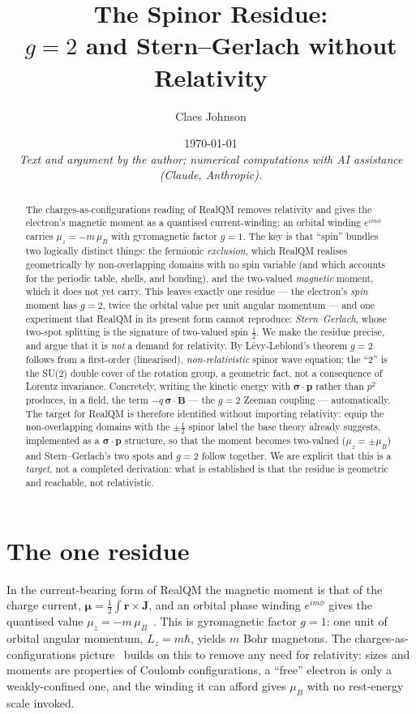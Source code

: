 \documentclass[11pt]{article}
\title{The Spinor Residue:\\
$g=2$ and Stern--Gerlach without Relativity}
\author[1]{Claes Johnson}
\affil[1]{KTH Royal Institute of Technology, SE-100 44 Stockholm, Sweden \\
\texttt{claesjohnson@gmail.com}}
\date{\today \\[0.4em]
\small\textit{Text and argument by the author; numerical computations with AI assistance (Claude, Anthropic).}}
\begin{document}
\maketitle

\begin{abstract}
The charges-as-configurations reading of RealQM removes relativity and gives the electron's magnetic
moment as a quantised current-winding: an orbital winding $e^{im\phi}$ carries $\mu_z = -m\,\mu_B$ with
gyromagnetic factor $g=1$. The key is that ``spin'' bundles two logically distinct things: the fermionic
\emph{exclusion}, which RealQM realises geometrically by non-overlapping domains with no spin variable
(and which accounts for the periodic table, shells, and bonding), and the two-valued \emph{magnetic}
moment, which it does not yet carry. This leaves exactly one residue --- the electron's \emph{spin} moment
has $g=2$, twice the orbital value per unit angular momentum --- and one experiment that RealQM in its
present form cannot reproduce: \emph{Stern--Gerlach}, whose two-spot splitting is the signature of
two-valued spin $\tfrac12$. We make the residue precise, and argue that it is \emph{not} a demand for relativity. By
Lévy-Leblond's theorem $g=2$ follows from a first-order (linearised), \emph{non-relativistic} spinor wave
equation; the ``2'' is the SU(2) double cover of the rotation group, a geometric fact, not a consequence
of Lorentz invariance. Concretely, writing the kinetic energy with $\boldsymbol\sigma\cdot\mathbf p$
rather than $p^2$ produces, in a field, the term $-q\,\boldsymbol\sigma\cdot\mathbf B$ --- the $g=2$
Zeeman coupling --- automatically. The target for RealQM is therefore identified without importing
relativity: equip the non-overlapping domains with the $\pm\tfrac12$ spinor label the base theory already
suggests, implemented as a $\boldsymbol\sigma\cdot\mathbf p$ structure, so that the moment becomes
two-valued ($\mu_z=\pm\mu_B$) and Stern--Gerlach's two spots and $g=2$ follow together. We are explicit
that this is a \emph{target}, not a completed derivation: what is established is that the residue is
geometric and reachable, not relativistic.
\end{abstract}


\section{The one residue}
\label{sec:residue}

In the current-bearing form of RealQM the magnetic moment is that of the charge current,
$\boldsymbol\mu=\tfrac12\int\mathbf r\times\mathbf J$, and an orbital phase winding $e^{im\phi}$ gives the
quantised value $\mu_z=-m\,\mu_B$~\cite{ComplexRealQM,NuclearMoment}. This is gyromagnetic factor
$g=1$: one unit of orbital angular momentum, $L_z=m\hbar$, yields $m$ Bohr magnetons. The
charges-as-configurations picture~\cite{Charges} builds on this to remove any need for relativity: sizes
and moments are properties of Coulomb configurations, a ``free'' electron is only a weakly-confined one,
and the winding it can afford gives $\mu_B$ with no rest-energy scale invoked.
\end{document}
